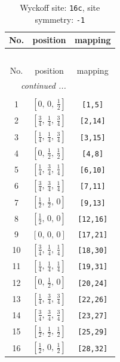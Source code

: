 \documentclass[fleqn,8pt]{jsarticle}
\begin{document}
\begin{longtable}{ccc}
\caption{Wyckoff site: {\tt 16c}, site symmetry: {\tt -1}}
 \\
 \hline \hline
No. & position & mapping \\ \hline \endfirsthead

\multicolumn{2}{l}{\tablename\ \thetable{}} \\
 \hline \hline
No. & position & mapping \\ \hline \endhead

 \hline \hline
\multicolumn{2}{r}{\footnotesize\it continued ...} \\ \endfoot

 \hline \hline
\multicolumn{2}{r}{} \\ \endlastfoot

1 & $\left[ 0,\, 0,\, \frac{1}{2} \right]$ & {\tt [1,5]} \\ \hline
2 & $\left[ \frac{3}{4},\, \frac{1}{4},\, \frac{3}{4} \right]$ & {\tt [2,14]} \\ \hline
3 & $\left[ \frac{1}{4},\, \frac{1}{4},\, \frac{3}{4} \right]$ & {\tt [3,15]} \\ \hline
4 & $\left[ 0,\, \frac{1}{2},\, \frac{1}{2} \right]$ & {\tt [4,8]} \\ \hline
5 & $\left[ \frac{1}{4},\, \frac{3}{4},\, \frac{1}{4} \right]$ & {\tt [6,10]} \\ \hline
6 & $\left[ \frac{3}{4},\, \frac{3}{4},\, \frac{1}{4} \right]$ & {\tt [7,11]} \\ \hline
7 & $\left[ \frac{1}{2},\, \frac{1}{2},\, 0 \right]$ & {\tt [9,13]} \\ \hline
8 & $\left[ \frac{1}{2},\, 0,\, 0 \right]$ & {\tt [12,16]} \\ \hline
9 & $\left[ 0,\, 0,\, 0 \right]$ & {\tt [17,21]} \\ \hline
10 & $\left[ \frac{3}{4},\, \frac{1}{4},\, \frac{1}{4} \right]$ & {\tt [18,30]} \\ \hline
11 & $\left[ \frac{1}{4},\, \frac{1}{4},\, \frac{1}{4} \right]$ & {\tt [19,31]} \\ \hline
12 & $\left[ 0,\, \frac{1}{2},\, 0 \right]$ & {\tt [20,24]} \\ \hline
13 & $\left[ \frac{1}{4},\, \frac{3}{4},\, \frac{3}{4} \right]$ & {\tt [22,26]} \\ \hline
14 & $\left[ \frac{3}{4},\, \frac{3}{4},\, \frac{3}{4} \right]$ & {\tt [23,27]} \\ \hline
15 & $\left[ \frac{1}{2},\, \frac{1}{2},\, \frac{1}{2} \right]$ & {\tt [25,29]} \\ \hline
16 & $\left[ \frac{1}{2},\, 0,\, \frac{1}{2} \right]$ & {\tt [28,32]} \\
\end{longtable}
\end{document}
